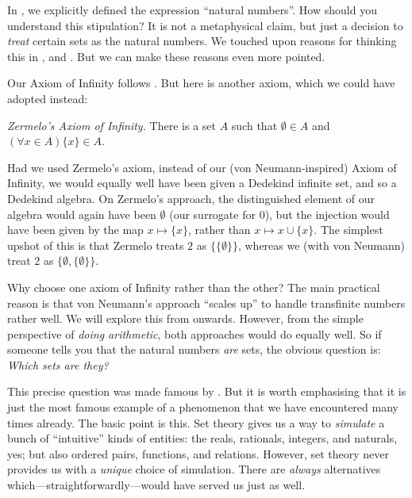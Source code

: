 \documentclass[../../../include/open-logic-section]{subfiles}
\begin{document}
	


In , we explicitly defined
the expression ``natural numbers''. How should you understand this
stipulation? It is not a metaphysical claim, but just a decision to
\emph{treat} certain sets as the natural numbers. We touched upon reasons for thinking this in
,  and
. But we can make these
reasons even more pointed.

Our Axiom of Infinity follows \citet{VonNeumann1925}. But here is
another axiom, which we could have adopted instead:

\begin{defish}
\emph{Zermelo's \citeyear{Zermelo1908Untersuchungen} Axiom of
Infinity.} There is a set $A$ such that $\emptyset \in A$ and
$(\forall x \in A)\{x\} \in A$. 
\end{defish}

Had we used Zermelo's axiom, instead of our (von Neumann-inspired)
Axiom of Infinity, we would equally well have been given a Dedekind
infinite set, and so a Dedekind algebra. On Zermelo's approach, the
distinguished element of our algebra would again have been $\emptyset$
(our surrogate for $0$), but the injection would have been given by
the map $x \mapsto \{x\}$, rather than $x \mapsto x \cup \{x\}$. The
simplest upshot of this is that Zermelo treats $2$ as
$\{\{\emptyset\}\}$, whereas we (with von Neumann) treat $2$ as
$\{\emptyset, \{\emptyset\}\}$. 

Why choose one axiom of Infinity rather than the other? The main
practical reason is that von Neumann's approach ``scales up'' to
handle transfinite numbers rather well. We will explore this from
 onwards. However, from the simple
perspective of \emph{doing arithmetic}, both approaches would do
equally well. So if someone tells you that the natural numbers
\emph{are} sets, the obvious question is: \emph{Which sets are they?} 

This precise question was made famous by \citet{Benacerraf1965}. But
it is worth emphasising that it is just the most famous example of a
phenomenon that we have encountered many times already. The basic
point is this. Set theory gives us a way to \emph{simulate} a bunch of
``intuitive'' kinds of entities: the reals, rationals, integers, and
naturals, yes; but also ordered pairs, functions, and relations.
However, set theory never provides us with a \emph{unique} choice of
simulation. There are \emph{always} alternatives
which---straightforwardly---would have served us just as well. 
\end{document}
